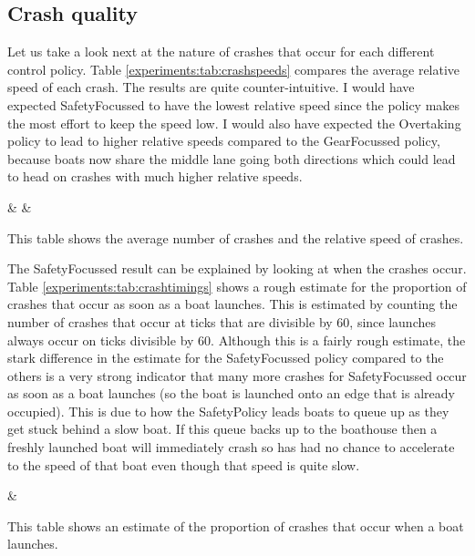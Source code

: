   \subsection{Crash quality}
  Let us take a look next at the nature of crashes that occur for each different control policy. Table \ref{experiments:tab:crashspeeds} compares the average relative speed of each crash. The results are quite counter-intuitive. I would have expected SafetyFocussed to have the lowest relative speed since the policy makes the most effort to keep the speed low. I would also have expected the Overtaking policy to lead to higher relative speeds compared to the GearFocussed policy, because boats now share the middle lane going both directions which could lead to head on crashes with much higher relative speeds.
  
  \begin{table}[h]
  \centering
  {\cp & \crashes & \speed}
  \caption{This table shows the average number of crashes and the relative speed of crashes.}
  \label{experiments:tab:crashspeeds}
  \end{table}
  
  The SafetyFocussed result can be explained by looking at when the crashes occur. Table \ref{experiments:tab:crashtimings} shows a rough estimate for the proportion of crashes that occur as soon as a boat launches. This is estimated by counting the number of crashes that occur at ticks that are divisible by 60, since launches always occur on ticks divisible by 60. Although this is a fairly rough estimate, the stark difference in the estimate for the SafetyFocussed policy compared to the others is a very strong indicator that many more crashes for SafetyFocussed occur as soon as a boat launches (so the boat is launched onto an edge that is already occupied). This is due to how the SafetyPolicy leads boats to queue up as they get stuck behind a slow boat. If this queue backs up to the boathouse then a freshly launched boat will immediately crash so has had no chance to accelerate to the speed of that boat even though that speed is quite slow.

  \begin{table}[h]
  \centering
  {\cp & \crashes }
  \caption{This table shows an estimate of the proportion of crashes that occur when a boat launches.}
  \label{experiments:tab:crashtimings}
  \end{table}
  

